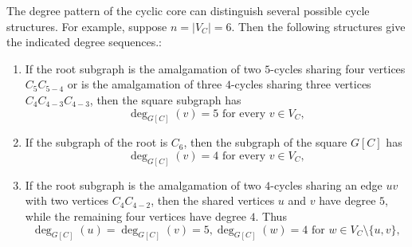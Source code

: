 \documentclass[11pt]{article}
\begin{document}
The degree pattern of the cyclic core can distinguish several possible cycle structures. For example, suppose $n = |V_C| = 6$. Then the following structures give the indicated degree sequences.:
\begin{enumerate}[label=\roman*)]
  \item If the root subgraph is the amalgamation of two $5$-cycles sharing four vertices $C_5C_{5-4}$ or is the amalgamation of three $4$-cycles sharing three vertices $C_4C_{4-3}C_{4-3}$, then the square subgraph has
  \[
  \deg_{G[C]}(v)=5 \text{ for every } v \in V_C,
  \]
  \item If the subgraph of the root is $C_6$, then the subgraph of the square $G[C]$ has
  \[
  \deg_{G[C]}(v)=4 \text{ for every } v \in V_C,
  \]
  \item If the root subgraph is the amalgamation of two $4$-cycles sharing an edge $uv$ with two vertices $C_4C_{4-2}$, then the shared vertices $u$ and $v$ have degree $5$, while the remaining four vertices have degree $4$. Thus
  \[
  \deg_{G[C]}(u)=\deg_{G[C]}(v)=5, \deg_{G[C]}(w)=4 \text{ for } w \in V_C \setminus\{u,v\},
  \]
\end{enumerate}
\end{document}
